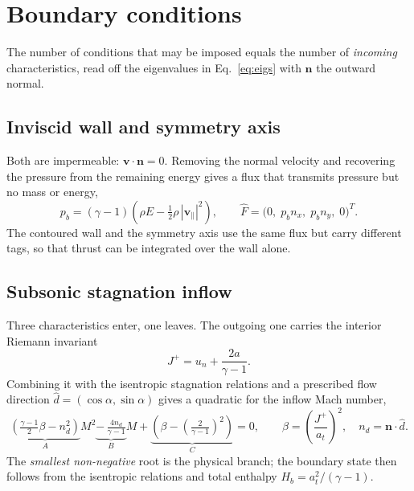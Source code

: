 \documentclass[11pt,a4paper]{article}
\newcommand{\vect}[1]{\boldsymbol{#1}}
\newcommand{\nvec}{\vect{n}}
\begin{document}
\section{Boundary conditions}
\label{sec:bc}

The number of conditions that may be imposed equals the number of \emph{incoming}
characteristics, read off the eigenvalues in Eq.~\eqref{eq:eigs} with $\nvec$
the outward normal.

\subsection{Inviscid wall and symmetry axis}

Both are impermeable: $\vect{v}\cdot\nvec = 0$.  Removing the normal velocity and
recovering the pressure from the remaining energy gives a flux that transmits
pressure but no mass or energy,
\begin{equation}
  p_b = (\gamma - 1)\left(\rho E - \tfrac{1}{2}\rho\,|\vect{v}_{\parallel}|^{2}\right),
  \qquad
  \hat{F} = \bigl(0,\; p_b n_x,\; p_b n_y,\; 0\bigr)^{T}.
  \label{eq:wall}
\end{equation}
The contoured wall and the symmetry axis use the same flux but carry different
tags, so that thrust can be integrated over the wall alone.

\subsection{Subsonic stagnation inflow}

Three characteristics enter, one leaves.  The outgoing one carries the interior
Riemann invariant
\begin{equation}
  J^{+} = u_n + \frac{2a}{\gamma - 1}.
\end{equation}
Combining it with the isentropic stagnation relations and a prescribed flow
direction $\hat{d} = (\cos\alpha, \sin\alpha)$ gives a quadratic for the inflow
Mach number,
\begin{equation}
  \underbrace{\left(\tfrac{\gamma-1}{2}\beta - n_d^{2}\right)}_{\textstyle A} M^{2}
  \underbrace{-\,\tfrac{4 n_d}{\gamma-1}}_{\textstyle B} M
  + \underbrace{\left(\beta - \left(\tfrac{2}{\gamma-1}\right)^{2}\right)}_{\textstyle C}
  = 0,
  \qquad
  \beta = \left(\frac{J^{+}}{a_t}\right)^{2},\quad n_d = \nvec\cdot\hat{d}.
  \label{eq:inflowquad}
\end{equation}
The \emph{smallest non-negative} root is the physical branch; the boundary state
then follows from the isentropic relations and total enthalpy
$H_b = a_t^{2}/(\gamma-1)$.
\end{document}
